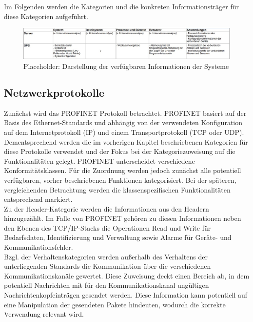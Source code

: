 Im Folgenden werden die Kategorien und die konkreten Informationsträger für diese Kategorien aufgeführt.

\begin{figure}[h]
\centering
\includegraphics[width=125mm]{Zeichnungen/IndustriesystemInformationen.jpg}
\caption{Placeholder: Darstellung der verfügbaren Informationen der Systeme}
\label{fig:IndustrySystemInformation}
\end{figure}

\subsection{Netzwerkprotokolle}
Zunächst wird das PROFINET Protokoll betrachtet. PROFINET basiert auf der Basis des Ethernet-Standards und abhängig von der verwendeten Konfiguration auf dem Internetprotokoll (IP) und einem Transportprotokoll (TCP oder UDP). Dementsprechend werden die im vorherigen Kapitel beschriebenen Kategorien für diese Protokolle verwendet und der Fokus bei der Kategoriezuweisung auf die Funktionalitäten gelegt. 
PROFINET unterscheidet verschiedene Konformitätsklassen. Für die Zuordnung werden jedoch zunächst alle potentiell verfügbaren, vorher beschriebenen Funktionen kategorisiert. Bei der späteren, vergleichenden Betrachtung werden die klassenspezifischen Funktionalitäten entsprechend markiert. \\

Zu der Header-Kategorie werden die Informationen aus den Headern hinzugezählt. Im Falle von PROFINET gehören zu diesen Informationen neben den Ebenen des TCP/IP-Stacks die Operationen Read und Write für Bedarfsdaten, Identifizierung und Verwaltung sowie Alarme für Geräte- und Kommunikationsfehler. \\

Bzgl. der Verhaltenskategorien werden außerhalb des Verhaltens der unterliegenden Standards die Kommunikation über die verschiedenen Kommunikationskanäle gewertet. Diese Zuweisung deckt einen Bereich ab, in dem potentiell Nachrichten mit für den Kommunikationskanal ungültigen Nachrichtenkopfeinträgen gesendet werden. Diese Information kann potentiell auf eine Manipulation der gesendeten Pakete hindeuten, wodurch die korrekte Verwendung relevant wird. \\

